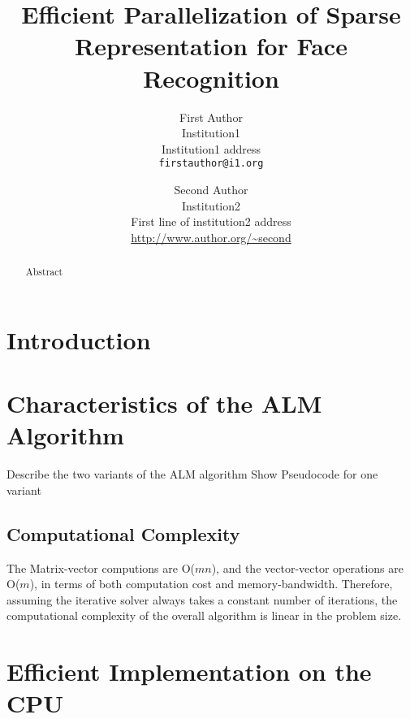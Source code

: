\documentclass[10pt,twocolumn,letterpaper]{article}
\begin{document}
\title{Efficient Parallelization of Sparse Representation for Face Recognition}

\author{First Author\\
Institution1\\
Institution1 address\\
{\tt\small firstauthor@i1.org}
\and
Second Author\\
Institution2\\
First line of institution2 address\\
{\small\url{http://www.author.org/~second}}
}

\maketitle

\begin{abstract}
Abstract
\end{abstract}

\section{Introduction}

\cite{Wagner2009-CVPR}
\cite{Wright2009-PAMI}

\section{Characteristics of the ALM Algorithm}
Describe the two variants of the ALM algorithm
Show Pseudocode for one variant
\subsection{Computational Complexity}
The Matrix-vector computions are O($mn$), and the vector-vector operations are O($m$), 
in terms of both computation cost and memory-bandwidth.
Therefore, assuming the iterative solver always takes a constant number of iterations,
the computational complexity of the overall algorithm is linear in the problem size.

\section{Efficient Implementation on the CPU}
\end{document}
